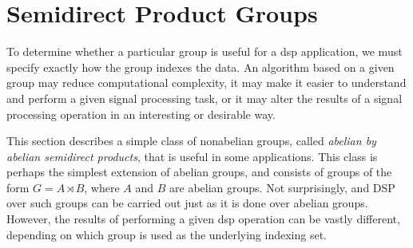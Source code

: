 \documentclass[reqno,onecolumn,oneside]{paper}
\newcommand{\<}{\ensuremath{\langle}}
\renewcommand{\>}{\ensuremath{\rangle}}
\newcommand{\sdp}{\ensuremath{\rtimes}}
\begin{document}
% 

%
%


%
%
%
%

%

%
\section{Semidirect Product Groups}
To determine whether a particular group is useful for a \ac{dsp} application, we must
specify exactly how the group indexes the data.
An algorithm based on a given group may reduce computational complexity, it
may make it easier to understand and perform a given signal processing task, or
it may alter the results of a signal processing operation in an interesting or
desirable way. 

This section describes a simple class of nonabelian groups, called
\emph{abelian by abelian semidirect products}, 
that is useful in some applications. This class is
perhaps the simplest extension of abelian groups, and consists of groups of the
form $G = A \sdp B$, where $A$ and $B$ 
are abelian groups. Not surprisingly, and DSP over such groups can be carried
out just as it is done over abelian groups.  However, the results of performing
a given \ac{dsp} operation can be vastly different, depending on which group is
used as the underlying indexing set.
\end{document}
